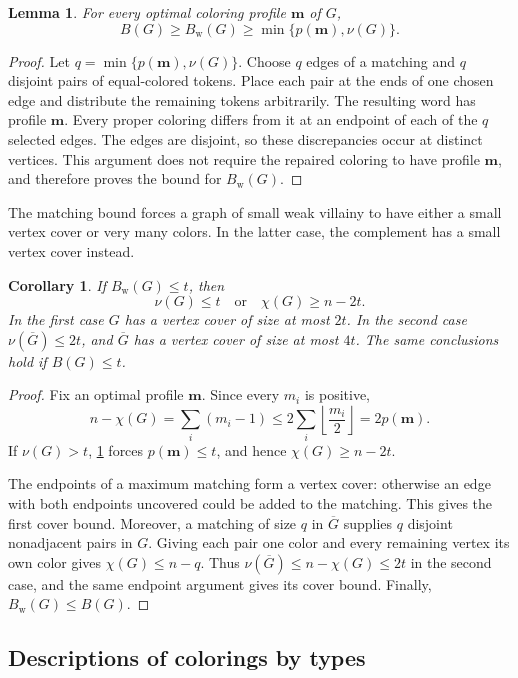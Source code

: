 \documentclass[11pt,reqno]{amsart}
\numberwithin{equation}{section}
\newtheorem{lemma}[theorem]{Lemma}
\newtheorem{corollary}[theorem]{Corollary}
\theoremstyle{definition}
\theoremstyle{remark}
\begin{document}
\begin{lemma}\label{rec:matching}
For every optimal coloring profile $\mathbf m$ of $G$,
\[
B(G)\geq B_{\mathrm w}(G)\geq\min\{p(\mathbf m),\nu(G)\}.
\]
\end{lemma}
\begin{proof}
Let $q=\min\{p(\mathbf m),\nu(G)\}$. Choose $q$ edges of a matching
and $q$ disjoint pairs of equal-colored tokens. Place each pair at the
ends of one chosen edge and distribute the remaining tokens arbitrarily.
The resulting word has profile $\mathbf m$. Every proper coloring
differs from it at an endpoint of each of the $q$ selected edges.
The edges are disjoint, so these discrepancies occur at distinct
vertices. This argument does not require the repaired coloring to
have profile $\mathbf m$, and therefore proves the bound for $B_{\mathrm w}(G)$.
\end{proof}

The matching bound forces a graph of small weak villainy to have
either a small vertex cover or very many colors. In the latter case,
the complement has a small vertex cover instead.

\begin{corollary}\label{rec:dichotomy}
If $B_{\mathrm w}(G)\leq t$, then
\[
\nu(G)\leq t\quad\text{or}\quad\chi(G)\geq n-2t.
\]
In the first case $G$ has a vertex cover of size at most $2t$.
In the second case $\nu(\overline G)\leq 2t$, and
$\overline G$ has a vertex cover of size at most $4t$.
The same conclusions hold if $B(G)\leq t$.
\end{corollary}
\begin{proof}
Fix an optimal profile $\mathbf m$. Since every $m_i$ is positive,
\[
n-\chi(G)=\sum_i(m_i-1)
\leq 2\sum_i\left\lfloor\frac{m_i}{2}\right\rfloor
=2p(\mathbf m).
\]
If $\nu(G)>t$, \cref{rec:matching} forces $p(\mathbf m)\leq t$,
and hence $\chi(G)\geq n-2t$.

The endpoints of a maximum matching form a vertex cover: otherwise
an edge with both endpoints uncovered could be added to the matching.
This gives the first cover bound. Moreover, a matching of size $q$ in
$\overline G$ supplies $q$ disjoint nonadjacent pairs in $G$. Giving
each pair one color and every remaining vertex its own color gives
$\chi(G)\leq n-q$. Thus $\nu(\overline G)\leq n-\chi(G)\leq 2t$
in the second case, and the same endpoint argument gives its cover
bound. Finally, $B_{\mathrm w}(G)\leq B(G)$.
\end{proof}

\subsection{Descriptions of colorings by types}\label{rec:types}
\end{document}
